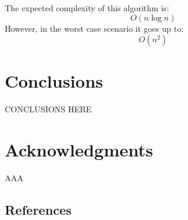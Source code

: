 \documentclass{vldb}
\begin{document}
The expected complexity of this algorithm is: \begin{displaymath}{O(n \log n)}\end{displaymath}
However, in the worst case scenario it goes up to: \begin{displaymath}{O(n^2)}\end{displaymath}

\section{Conclusions}
CONCLUSIONS HERE

\balance

\section{Acknowledgments}
AAA




\subsection{References}
\end{document}
